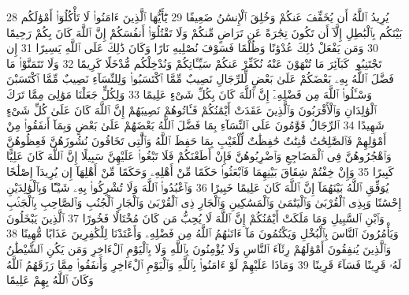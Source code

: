 {\tiny\colorbox{cl_aya}{28}} يُرِيدُ ٱللَّهُ أَن يُخَفِّفَ عَنكُمْ وَخُلِقَ ٱلْإِنسَٰنُ ضَعِيفًا
{\tiny\colorbox{cl_aya}{29}} يَٰٓأَيُّهَا ٱلَّذِينَ ءَامَنُوا۟ لَا تَأْكُلُوٓا۟ أَمْوَٰلَكُم بَيْنَكُم بِٱلْبَٰطِلِ إِلَّآ أَن تَكُونَ تِجَٰرَةً عَن تَرَاضٍ مِّنكُمْ وَلَا تَقْتُلُوٓا۟ أَنفُسَكُمْ إِنَّ ٱللَّهَ كَانَ بِكُمْ رَحِيمًا
{\tiny\colorbox{cl_aya}{30}} وَمَن يَفْعَلْ ذَٰلِكَ عُدْوَٰنًا وَظُلْمًا فَسَوْفَ نُصْلِيهِ نَارًا وَكَانَ ذَٰلِكَ عَلَى ٱللَّهِ يَسِيرًا
{\tiny\colorbox{cl_aya}{31}} إِن تَجْتَنِبُوا۟ كَبَآئِرَ مَا تُنْهَوْنَ عَنْهُ نُكَفِّرْ عَنكُمْ سَيِّـَٔاتِكُمْ وَنُدْخِلْكُم مُّدْخَلًا كَرِيمًا
{\tiny\colorbox{cl_aya}{32}} وَلَا تَتَمَنَّوْا۟ مَا فَضَّلَ ٱللَّهُ بِهِۦ بَعْضَكُمْ عَلَىٰ بَعْضٍ لِّلرِّجَالِ نَصِيبٌ مِّمَّا ٱكْتَسَبُوا۟ وَلِلنِّسَآءِ نَصِيبٌ مِّمَّا ٱكْتَسَبْنَ وَسْـَٔلُوا۟ ٱللَّهَ مِن فَضْلِهِۦٓ إِنَّ ٱللَّهَ كَانَ بِكُلِّ شَىْءٍ عَلِيمًا
{\tiny\colorbox{cl_aya}{33}} وَلِكُلٍّ جَعَلْنَا مَوَٰلِىَ مِمَّا تَرَكَ ٱلْوَٰلِدَانِ وَٱلْأَقْرَبُونَ وَٱلَّذِينَ عَقَدَتْ أَيْمَٰنُكُمْ فَـَٔاتُوهُمْ نَصِيبَهُمْ إِنَّ ٱللَّهَ كَانَ عَلَىٰ كُلِّ شَىْءٍ شَهِيدًا
{\tiny\colorbox{cl_aya}{34}} ٱلرِّجَالُ قَوَّٰمُونَ عَلَى ٱلنِّسَآءِ بِمَا فَضَّلَ ٱللَّهُ بَعْضَهُمْ عَلَىٰ بَعْضٍ وَبِمَآ أَنفَقُوا۟ مِنْ أَمْوَٰلِهِمْ فَٱلصَّٰلِحَٰتُ قَٰنِتَٰتٌ حَٰفِظَٰتٌ لِّلْغَيْبِ بِمَا حَفِظَ ٱللَّهُ وَٱلَّٰتِى تَخَافُونَ نُشُوزَهُنَّ فَعِظُوهُنَّ وَٱهْجُرُوهُنَّ فِى ٱلْمَضَاجِعِ وَٱضْرِبُوهُنَّ فَإِنْ أَطَعْنَكُمْ فَلَا تَبْغُوا۟ عَلَيْهِنَّ سَبِيلًا إِنَّ ٱللَّهَ كَانَ عَلِيًّا كَبِيرًا
{\tiny\colorbox{cl_aya}{35}} وَإِنْ خِفْتُمْ شِقَاقَ بَيْنِهِمَا فَٱبْعَثُوا۟ حَكَمًا مِّنْ أَهْلِهِۦ وَحَكَمًا مِّنْ أَهْلِهَآ إِن يُرِيدَآ إِصْلَٰحًا يُوَفِّقِ ٱللَّهُ بَيْنَهُمَآ إِنَّ ٱللَّهَ كَانَ عَلِيمًا خَبِيرًا
{\tiny\colorbox{cl_aya}{36}} وَٱعْبُدُوا۟ ٱللَّهَ وَلَا تُشْرِكُوا۟ بِهِۦ شَيْـًٔا وَبِٱلْوَٰلِدَيْنِ إِحْسَٰنًا وَبِذِى ٱلْقُرْبَىٰ وَٱلْيَتَٰمَىٰ وَٱلْمَسَٰكِينِ وَٱلْجَارِ ذِى ٱلْقُرْبَىٰ وَٱلْجَارِ ٱلْجُنُبِ وَٱلصَّاحِبِ بِٱلْجَنۢبِ وَٱبْنِ ٱلسَّبِيلِ وَمَا مَلَكَتْ أَيْمَٰنُكُمْ إِنَّ ٱللَّهَ لَا يُحِبُّ مَن كَانَ مُخْتَالًا فَخُورًا
{\tiny\colorbox{cl_aya}{37}} ٱلَّذِينَ يَبْخَلُونَ وَيَأْمُرُونَ ٱلنَّاسَ بِٱلْبُخْلِ وَيَكْتُمُونَ مَآ ءَاتَىٰهُمُ ٱللَّهُ مِن فَضْلِهِۦ وَأَعْتَدْنَا لِلْكَٰفِرِينَ عَذَابًا مُّهِينًا
{\tiny\colorbox{cl_aya}{38}} وَٱلَّذِينَ يُنفِقُونَ أَمْوَٰلَهُمْ رِئَآءَ ٱلنَّاسِ وَلَا يُؤْمِنُونَ بِٱللَّهِ وَلَا بِٱلْيَوْمِ ٱلْءَاخِرِ وَمَن يَكُنِ ٱلشَّيْطَٰنُ لَهُۥ قَرِينًا فَسَآءَ قَرِينًا
{\tiny\colorbox{cl_aya}{39}} وَمَاذَا عَلَيْهِمْ لَوْ ءَامَنُوا۟ بِٱللَّهِ وَٱلْيَوْمِ ٱلْءَاخِرِ وَأَنفَقُوا۟ مِمَّا رَزَقَهُمُ ٱللَّهُ وَكَانَ ٱللَّهُ بِهِمْ عَلِيمًا

